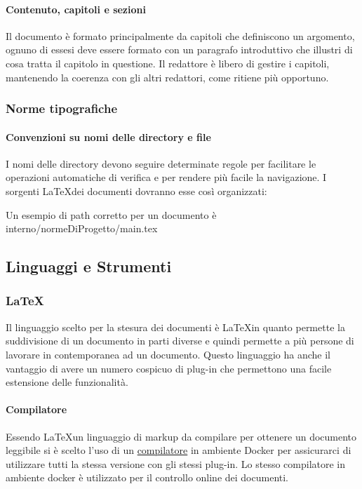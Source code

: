 \paragraph{Contenuto, capitoli e sezioni}
Il documento è formato principalmente da capitoli che definiscono un argomento,
ognuno di essesi deve essere formato con un paragrafo introduttivo che illustri
di cosa tratta il capitolo in questione.
Il redattore è libero di gestire i capitoli, mantenendo la coerenza con gli altri
redattori, come ritiene più opportuno.
\subsubsection{Norme tipografiche}
\paragraph{Convenzioni su nomi delle directory e file}
I nomi delle directory devono seguire determinate regole per facilitare le operazioni
automatiche di verifica e per rendere più facile la navigazione.
I sorgenti \LaTeX \space dei documenti dovranno esse così organizzati:


Un esempio di path corretto per un documento è interno/normeDiProgetto/main.tex

\subsection{Linguaggi e Strumenti}
\subsubsection{\LaTeX}
Il linguaggio scelto per la stesura dei documenti è \LaTeX \space in quanto permette
la suddivisione di un documento in parti diverse e quindi permette a più persone
di lavorare in contemporanea ad un documento.
Questo linguaggio ha anche il vantaggio di avere un numero cospicuo di plug-in
che permettono una facile estensione delle funzionalità.

\paragraph{Compilatore}
Essendo \LaTeX \space un linguaggio di markup da compilare per ottenere un documento
leggibile si è scelto l'uso di un
\href{https://github.com/dante-ev/docker-texlive}{compilatore} in ambiente Docker\glo
per assicurarci di utilizzare tutti la stessa versione con gli stessi plug-in.
Lo stesso compilatore in ambiente docker è utilizzato per il controllo online dei
documenti.

